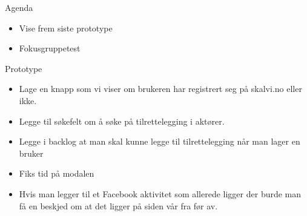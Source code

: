 {\large{Agenda}}
\begin{itemize}
\setlength\itemsep{-0.7em}
    \item Vise frem siste prototype
    \item Fokusgruppetest
\end{itemize} 


{\large{Prototype}}
\begin{itemize}
\setlength\itemsep{-0.7em}
    \item Lage en knapp som vi viser om brukeren har registrert seg på skalvi.no eller ikke.
    \item Legge til søkefelt om å søke på tilrettelegging i aktører.
    \item Legge i backlog at man skal kunne legge til tilrettelegging når man lager en bruker
    \item Fiks tid på modalen
    \item Hvis man legger til et Facebook aktivitet som allerede ligger der burde man få en beskjed om at det ligger på siden vår fra før av.
\end{itemize}

